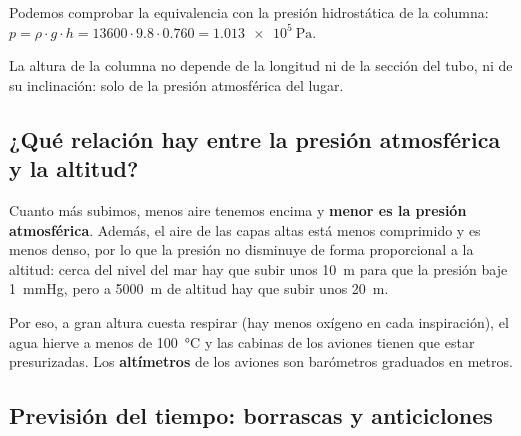 Podemos comprobar la equivalencia con la presión hidrostática de la columna: \(p = \rho \cdot g \cdot h = 13600 \cdot \num{9.8} \cdot \num{0.760} = \qty{1.013e5}{\pascal}\).

La altura de la columna no depende de la longitud ni de la sección del tubo, ni de su inclinación: solo de la presión atmosférica del lugar.

\subsection{¿Qué relación hay entre la presión atmosférica y la altitud?}

Cuanto más subimos, menos aire tenemos encima y \textbf{menor es la presión atmosférica}. Además, el aire de las capas altas está menos comprimido y es menos denso, por lo que la presión no disminuye de forma proporcional a la altitud: cerca del nivel del mar hay que subir unos \qty{10}{\m} para que la presión baje \qty{1}{\mmHg}, pero a \qty{5000}{\m} de altitud hay que subir unos \qty{20}{\m}.

\begin{center}
\end{center}

Por eso, a gran altura cuesta respirar (hay menos oxígeno en cada inspiración), el agua hierve a menos de \qty{100}{\degreeCelsius} y las cabinas de los aviones tienen que estar presurizadas. Los \textbf{altímetros} de los aviones son barómetros graduados en metros.

\subsection{Previsión del tiempo: borrascas y anticiclones}

